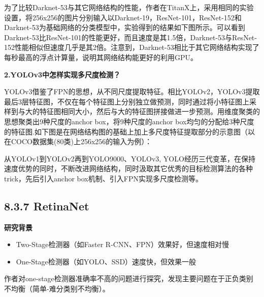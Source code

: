 为了比较Darknet-53与其它网络结构的性能，作者在TitanX上，采用相同的实验设置，将256x256的图片分别输入以Darknet-19，ResNet-101，ResNet-152和Darknet-53为基础网络的分类模型中，实验得到的结果如下图所示。可以看到Darknet-53比ResNet-101的性能更好，而且速度是其1.5倍，Darknet-53与ResNet-152性能相似但速度几乎是其2倍。注意到，Darknet-53相比于其它网络结构实现了每秒最高的浮点计算量，说明其网络结构能更好的利用GPU。

\begin{figure}
\centering
\caption{}
\end{figure}

\textbf{2.YOLOv3中怎样实现多尺度检测？}

YOLOv3借鉴了FPN的思想，从不同尺度提取特征。相比YOLOv2，YOLOv3提取最后3层特征图，不仅在每个特征图上分别独立做预测，同时通过将小特征图上采样到与大的特征图相同大小，然后与大的特征图拼接做进一步预测。用维度聚类的思想聚类出9种尺度的anchor
box，将9种尺度的anchor
box均匀的分配给3种尺度的特征图.如下图是在网络结构图的基础上加上多尺度特征提取部分的示意图（以在COCO数据集(80类)上256x256的输入为例）：

\begin{figure}
\centering
\caption{}
\end{figure}

从YOLOv1到YOLOv2再到YOLO9000、YOLOv3,
YOLO经历三代变革，在保持速度优势的同时，不断改进网络结构，同时汲取其它优秀的目标检测算法的各种trick，先后引入anchor
box机制、引入FPN实现多尺度检测等。

\subsection{8.3.7 RetinaNet}\label{retinanet}

\textbf{研究背景}

\begin{itemize}
\item
  Two-Stage检测器（如Faster R-CNN、FPN）效果好，但速度相对慢
\item
  One-Stage检测器（如YOLO、SSD）速度快，但效果一般
\end{itemize}

\begin{figure}
\centering
\caption{}
\end{figure}

作者对one-stage检测器准确率不高的问题进行探究，发现主要问题在于正负类别不均衡（简单-难分类别不均衡）。

